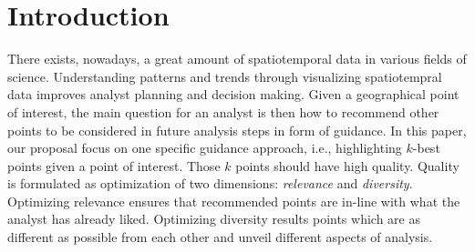 \documentclass[conference]{IEEEtran}
\begin{document}
\IEEEpeerreviewmaketitle

\vspace{-5pt}
\section{Introduction} 





There exists, nowadays, a great amount of spatiotemporal data in various fields of science. Understanding patterns and trends through visualizing spatiotempral data improves analyst planning and decision making.
Given a geographical point of interest, the main question  for an analyst is then how to recommend other points to be considered in future analysis steps in form of guidance. In this paper, our proposal focus on one specific guidance approach, i.e., highlighting $k$-best points given a point of interest. Those $k$ points should have high quality. Quality is formulated as optimization of two dimensions: {\em relevance} and {\em diversity}. Optimizing relevance ensures that recommended points are in-line with what the analyst has already liked. Optimizing diversity results points which are as different as possible from each other and unveil different aspects of analysis. 
\end{document}
